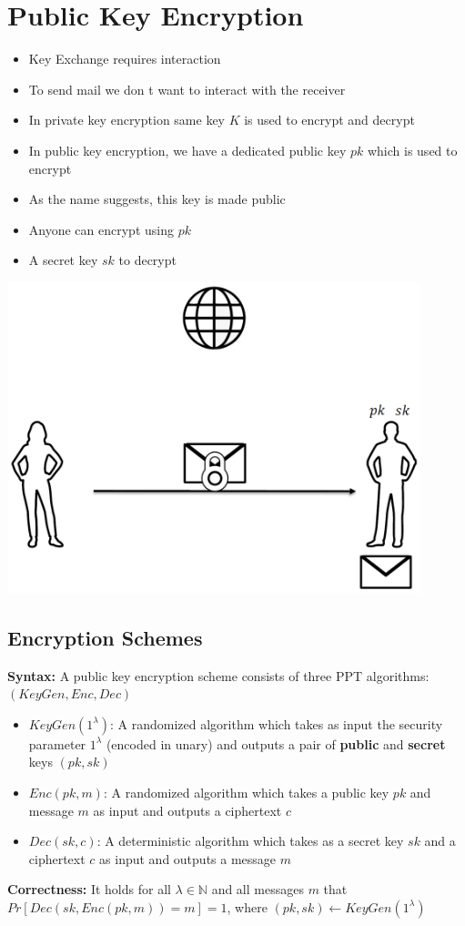 

\chapter{Public Key Encryption}
	
	\begin{itemize}
		\item Key Exchange requires interaction
		\item To send mail we don t want to interact with the receiver
		\item In private key encryption same key $K$ is used to encrypt and decrypt
		\item In public key encryption, we have a dedicated public key $pk$ which is used to encrypt
		\item As the name suggests, this key is made public
		\item Anyone can encrypt using $pk$
		\item A secret key $sk$ to decrypt
	\end{itemize}
	\begin{center}
		\includegraphics[width=120mm]{Graphics/Public Key Encryption/pke1.png}
	\end{center}
			
\section{Encryption Schemes}
	\textbf{Syntax:} A public key encryption scheme consists of three PPT algorithms: $(KeyGen,Enc,Dec)$
	\begin{itemize}
		\item $KeyGen(1^{\lambda})$: A randomized algorithm which takes as input the security parameter $1^{\lambda}$ (encoded in unary) 
		and outputs a pair of \textbf{public} and \textbf{secret} keys $(pk,sk)$
		\item $Enc(pk,m)$: A randomized algorithm which takes a public key $pk$ and message $m$ as input and outputs a ciphertext $c$
		\item $Dec(sk,c)$: A deterministic algorithm which takes as a secret key $sk$ and a ciphertext $c$ as input and outputs a message $m$
	\end{itemize}
	\textbf{Correctness:} It holds for all $\lambda \in \mathbb{N}$ and all messages $m$ that $Pr[Dec(sk,Enc(pk,m))=m]=1$, where $(pk,sk) \leftarrow KeyGen(1^{\lambda})$

